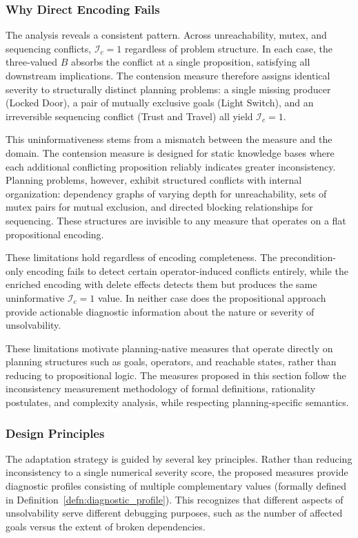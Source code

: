 \subsubsection{Why Direct Encoding Fails}

The analysis reveals a consistent pattern. Across unreachability, mutex, and sequencing conflicts, $\mathcal{I}_c = 1$ regardless of problem structure. In each case, the three-valued $B$ absorbs the conflict at a single proposition, satisfying all downstream implications. The contension measure therefore assigns identical severity to structurally distinct planning problems: a single missing producer (Locked Door), a pair of mutually exclusive goals (Light Switch), and an irreversible sequencing conflict (Trust and Travel) all yield $\mathcal{I}_c = 1$.

This uninformativeness stems from a mismatch between the measure and the domain. The contension measure is designed for static knowledge bases where each additional conflicting proposition reliably indicates greater inconsistency. Planning problems, however, exhibit structured conflicts with internal organization: dependency graphs of varying depth for unreachability, sets of mutex pairs for mutual exclusion, and directed blocking relationships for sequencing. These structures are invisible to any measure that operates on a flat propositional encoding.

These limitations hold regardless of encoding completeness. The precondition-only encoding fails to detect certain operator-induced conflicts entirely, while the enriched encoding with delete effects detects them but produces the same uninformative $\mathcal{I}_c = 1$ value. In neither case does the propositional approach provide actionable diagnostic information about the nature or severity of unsolvability.

These limitations motivate planning-native measures that operate directly on planning structures such as goals, operators, and reachable states, rather than reducing to propositional logic. The measures proposed in this section follow the inconsistency measurement methodology of formal definitions, rationality postulates, and complexity analysis, while respecting planning-specific semantics.

\subsubsection{Design Principles}

The adaptation strategy is guided by several key principles. Rather than reducing inconsistency to a single numerical severity score, the proposed measures provide diagnostic profiles consisting of multiple complementary values (formally defined in Definition~\ref{defn:diagnostic_profile}). This recognizes that different aspects of unsolvability serve different debugging purposes, such as the number of affected goals versus the extent of broken dependencies.


